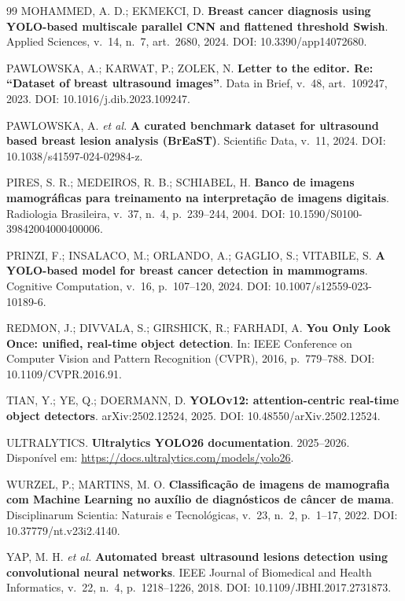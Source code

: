 \documentclass[11pt,a4paper]{article}
\begin{document}
\begin{thebibliography}{99}
MOHAMMED, A. D.; EKMEKCI, D.
\textbf{Breast cancer diagnosis using YOLO-based multiscale parallel CNN and
flattened threshold Swish}.
Applied Sciences, v.~14, n.~7, art.~2680, 2024. DOI: 10.3390/app14072680.

PAWLOWSKA, A.; KARWAT, P.; ZOLEK, N.
\textbf{Letter to the editor. Re: ``Dataset of breast ultrasound images''}.
Data in Brief, v.~48, art.~109247, 2023. DOI: 10.1016/j.dib.2023.109247.

PAWLOWSKA, A. \textit{et al.}
\textbf{A curated benchmark dataset for ultrasound based breast lesion analysis
(BrEaST)}.
Scientific Data, v.~11, 2024. DOI: 10.1038/s41597-024-02984-z.

PIRES, S. R.; MEDEIROS, R. B.; SCHIABEL, H.
\textbf{Banco de imagens mamográficas para treinamento na interpretação de
imagens digitais}.
Radiologia Brasileira, v.~37, n.~4, p.~239--244, 2004.
DOI: 10.1590/S0100-39842004000400006.

PRINZI, F.; INSALACO, M.; ORLANDO, A.; GAGLIO, S.; VITABILE, S.
\textbf{A YOLO-based model for breast cancer detection in mammograms}.
Cognitive Computation, v.~16, p.~107--120, 2024. DOI: 10.1007/s12559-023-10189-6.

REDMON, J.; DIVVALA, S.; GIRSHICK, R.; FARHADI, A.
\textbf{You Only Look Once: unified, real-time object detection}.
In: IEEE Conference on Computer Vision and Pattern Recognition (CVPR), 2016,
p.~779--788. DOI: 10.1109/CVPR.2016.91.

TIAN, Y.; YE, Q.; DOERMANN, D.
\textbf{YOLOv12: attention-centric real-time object detectors}.
arXiv:2502.12524, 2025. DOI: 10.48550/arXiv.2502.12524.

ULTRALYTICS.
\textbf{Ultralytics YOLO26 documentation}. 2025--2026.
Disponível em: \url{https://docs.ultralytics.com/models/yolo26}.

WURZEL, P.; MARTINS, M. O.
\textbf{Classificação de imagens de mamografia com Machine Learning no auxílio de
diagnósticos de câncer de mama}.
Disciplinarum Scientia: Naturais e Tecnológicas, v.~23, n.~2, p.~1--17, 2022.
DOI: 10.37779/nt.v23i2.4140.

YAP, M. H. \textit{et al.}
\textbf{Automated breast ultrasound lesions detection using convolutional neural
networks}.
IEEE Journal of Biomedical and Health Informatics, v.~22, n.~4, p.~1218--1226,
2018. DOI: 10.1109/JBHI.2017.2731873.

\end{thebibliography}
\end{document}
